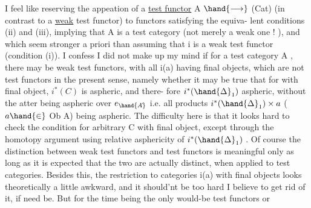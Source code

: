 I feel like reserving the appeation of a \uline{test functor}  A $\hand{\longrightarrow}$ (Cat)
(in contrast to a \uline{weak} test functor)  to functors satisfying the equiva-%
lent conditions (ii) and (iii),  implying that A is a test category (not
merely a weak one ! ),  and which seem stronger a priori than assuming
 that i is a weak test functor  (condition (i)).  I confess I did
not make up my mind if  for a test category A , there may be weak
test functors,  with all i(a) having final objects,  which are not test
functors in the present sense,  namely whether it may be true that  for
  with final object,  $i^*(C)$ is aspheric,  and  there-%
fore $i^*(\hand{\Delta}_1)$ aspheric,  without the atter being aspheric over $e_{\hand{A\hat{}}}$ i.e.
all products $i^*(\hand{\Delta}_1) \times a$  ($a \hand{\in}$ Ob A) being aspheric.  The difficulty here
is that it looks hard to check the condition for arbitrary C with final
object,  except through the homotopy argument using relative asphericity
of $i^*(\hand{\Delta}_1)$ .  Of course the distinction between weak test functors and test
functors is meaningful only as long as it is expected that the two are
actually distinct,  when applied to test categories.  Besides this,  the
restriction to categories i(a) with final objects looks theoretically a
little awkward,  and it should'nt be too hard I believe to get rid of it,
if need be.  But for the time being the only would-be test functors or
